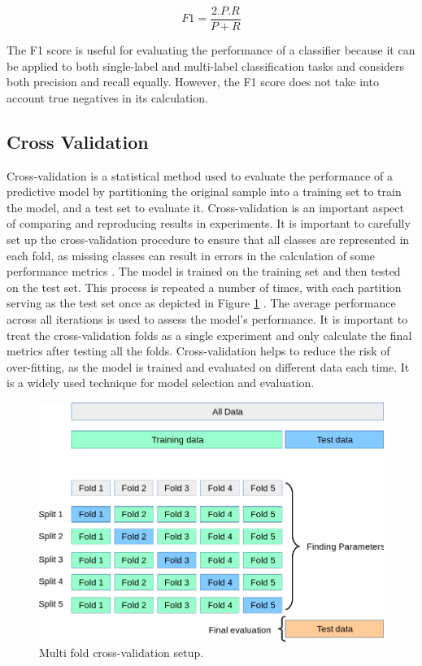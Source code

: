 \begin{equation}
\label{eq:f1score}
    F1 = \frac{2 . P . R}{P+R}
\end{equation}

The F1 score is useful for evaluating the performance of a classifier because it can be applied to both single-label and multi-label classification tasks and considers both precision and recall equally. However, the F1 score does not take into account true negatives in its calculation.


\subsection{Cross Validation}
\label{cross_validation}
Cross-validation is a statistical method used to evaluate the performance of a predictive model by partitioning the original sample into a training set to train the model, and a test set to evaluate it. Cross-validation is an important aspect of comparing and reproducing results in experiments. It is important to carefully set up the cross-validation procedure to ensure that all classes are represented in each fold, as missing classes can result in errors in the calculation of some performance metrics \cite{sechidis2011stratification}. The model is trained on the training set and then tested on the test set. This process is repeated a number of times, with each partition serving as the test set once as depicted in Figure \ref{fig:crossvalidation} \cite{scikit-learn_cv}. The average performance across all iterations is used to assess the model's performance. It is important to treat the cross-validation folds as a single experiment and only calculate the final metrics after testing all the folds. Cross-validation helps to reduce the risk of over-fitting, as the model is trained and evaluated on different data each time. It is a widely used technique for model selection and evaluation.




\begin{figure}[htbp]
   \begin{center}
      \includegraphics[width=0.8\linewidth]{Chapitre1/figures/grid_search_cross_validation.png}
   \end{center}
   \caption{ Multi fold cross-validation setup.}
   \label{fig:crossvalidation}
\end{figure}






